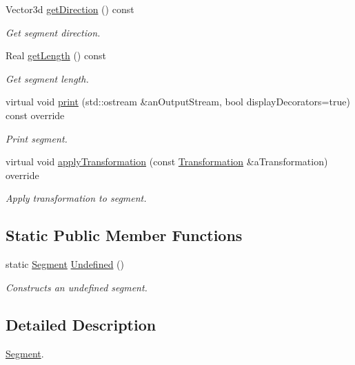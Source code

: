 \begin{DoxyCompactItemize}
Vector3d \hyperlink{classlibrary_1_1math_1_1geom_1_1d3_1_1objects_1_1_segment_afc15a855d660d67e96467466c4442bbc}{get\+Direction} () const
\begin{DoxyCompactList}\small\item\em Get segment direction. \end{DoxyCompactList}\item 
Real \hyperlink{classlibrary_1_1math_1_1geom_1_1d3_1_1objects_1_1_segment_a16b011c680e3102b8b44e6c88ffff81d}{get\+Length} () const
\begin{DoxyCompactList}\small\item\em Get segment length. \end{DoxyCompactList}\item 
virtual void \hyperlink{classlibrary_1_1math_1_1geom_1_1d3_1_1objects_1_1_segment_a2d3c1a17842ee4ee83cffda33911291d}{print} (std\+::ostream \&an\+Output\+Stream, bool display\+Decorators=true) const override
\begin{DoxyCompactList}\small\item\em Print segment. \end{DoxyCompactList}\item 
virtual void \hyperlink{classlibrary_1_1math_1_1geom_1_1d3_1_1objects_1_1_segment_a63c7017391bcc0e67f4d97311e7ebdb2}{apply\+Transformation} (const \hyperlink{classlibrary_1_1math_1_1geom_1_1d3_1_1_transformation}{Transformation} \&a\+Transformation) override
\begin{DoxyCompactList}\small\item\em Apply transformation to segment. \end{DoxyCompactList}\end{DoxyCompactItemize}
\subsection*{Static Public Member Functions}
\begin{DoxyCompactItemize}
\item 
static \hyperlink{classlibrary_1_1math_1_1geom_1_1d3_1_1objects_1_1_segment}{Segment} \hyperlink{classlibrary_1_1math_1_1geom_1_1d3_1_1objects_1_1_segment_a3b2505e9553ba0067f8184120c106602}{Undefined} ()
\begin{DoxyCompactList}\small\item\em Constructs an undefined segment. \end{DoxyCompactList}\end{DoxyCompactItemize}


\subsection{Detailed Description}
\hyperlink{classlibrary_1_1math_1_1geom_1_1d3_1_1objects_1_1_segment}{Segment}. 

